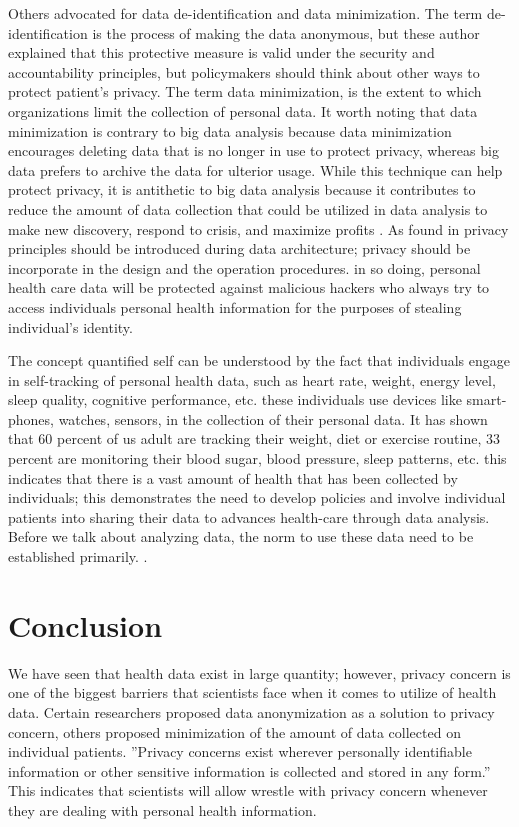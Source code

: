 \documentclass[sigconf]{acmart}
\begin{document}
Others advocated for data de-identification and data minimization. The term de-identification is the process of making the data anonymous, but these author explained that this protective measure is valid under the security and accountability principles, but policymakers should think about other ways to protect patient’s privacy. The term data minimization, is the extent to which organizations limit the collection of personal data. It worth noting that data minimization is contrary to big data analysis because data minimization encourages deleting data that is no longer in use to protect privacy, whereas big data prefers to archive the data for ulterior usage. While this technique can help protect privacy, it is antithetic to big data analysis because it contributes to reduce the amount of data collection that could be utilized in data analysis to make new discovery, respond to crisis, and maximize profits \cite{tene2012big}. 
As found in \cite{cavoukian2012privacy} privacy principles should be introduced during data architecture; privacy should be incorporate in the design and the operation procedures. in so doing, personal health care data will be protected against malicious hackers who always try to access individuals personal health information for the purposes of stealing individual's identity. 

The concept quantified self can be understood by the fact that individuals engage in self-tracking of personal health data, such as heart rate, weight, energy level, sleep quality, cognitive performance, etc. these individuals use devices like smart-phones, watches, sensors, in the collection of their personal data. It has shown that 60 percent of us adult are tracking their weight, diet or exercise routine, 33 percent are monitoring their blood sugar, blood pressure, sleep patterns, etc. this indicates that there is a vast amount of health that has been collected by individuals; this demonstrates the need to develop policies and involve individual patients into sharing their data to advances health-care through data analysis. Before we talk about analyzing data, the norm to use these data need to be established primarily. \cite{swan2013quantified}.



\section{Conclusion}

We have seen that health data exist in large quantity; however, privacy concern is one of the biggest barriers that scientists face when it comes to utilize of health data. Certain researchers proposed data anonymization as a solution to privacy concern, others proposed minimization of the amount of data collected on individual patients. ''Privacy concerns exist wherever personally identifiable information or other sensitive information is collected and stored in any form.''\cite{khan2014big} This indicates that scientists will allow wrestle with privacy concern whenever they are dealing with personal health information.  
\end{document}
